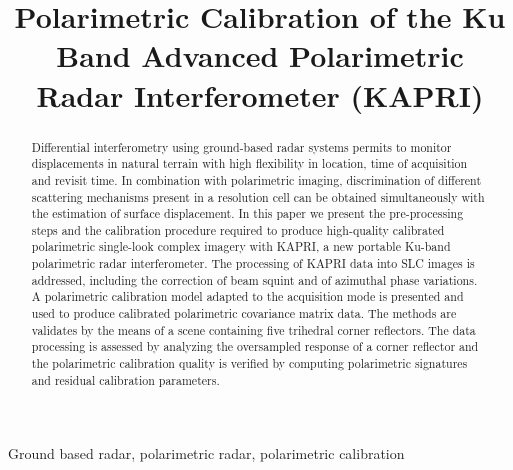 \documentclass[journal, 10pt, final,letterpaper,]{IEEEtran}
\title{Polarimetric Calibration of the Ku Band Advanced Polarimetric Radar Interferometer (KAPRI)}
\author{\IEEEauthorblockN{
	Simone Baffelli,~\IEEEmembership{Student Member,~IEEE},
	Othmar Frey,~\IEEEmembership{Member,~IEEE},
	Charles Werner,~\IEEEmembership{Senior Member,~IEEE}, and
	Irena Hajnsek,~\IEEEmembership{Fellow,~IEEE}
}}
\begin{document}
\maketitle
\begin{abstract}
Differential interferometry using ground-based radar systems permits to monitor displacements in natural terrain with  high flexibility in location, time of acquisition and revisit time. In combination with polarimetric imaging, discrimination of different scattering mechanisms present in a resolution cell can be obtained simultaneously with the estimation of surface displacement.
In this paper we present the pre-processing steps and the calibration procedure required to produce high-quality calibrated polarimetric single-look complex imagery with KAPRI, a new portable Ku-band polarimetric radar interferometer. The processing of KAPRI data into SLC images is addressed, including the correction of beam squint and of azimuthal phase variations. A polarimetric calibration model adapted to the acquisition mode is presented and used to produce calibrated polarimetric covariance matrix data. The methods are validates by the means of a scene containing five trihedral corner reflectors. The data processing is assessed by analyzing the oversampled response of a corner reflector and the polarimetric calibration quality is verified by computing polarimetric signatures and residual calibration parameters.
\end{abstract}
\begin{IEEEkeywords}
Ground based radar, polarimetric radar, polarimetric calibration
\end{IEEEkeywords}









\end{document}

